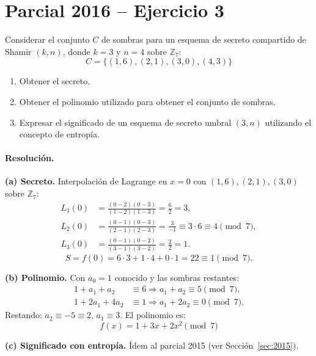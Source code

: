 \documentclass[11pt,a4paper]{article}
\begin{document}
\section{Parcial 2016 -- Ejercicio 3}
\label{sec:2016}

\begin{consignabox}
Considerar el conjunto $C$ de sombras para un esquema de secreto compartido de Shamir $(k,n)$, donde $k=3$ y $n=4$ sobre $\mathbb{Z}_7$:
\[
  C = \{(1,6),(2,1),(3,0),(4,3)\}
\]
\begin{enumerate}[label=\textbf{\alph*)}]
  \item Obtener el secreto.
  \item Obtener el polinomio utilizado para obtener el conjunto de sombras.
  \item Expresar el significado de un esquema de secreto umbral $(3,n)$ utilizando el concepto de entropía.
\end{enumerate}
\end{consignabox}

\paragraph{Resolución.}

\textbf{(a) Secreto.} Interpolación de Lagrange en $x=0$ con $(1,6),(2,1),(3,0)$ sobre $\mathbb{Z}_7$:
\begin{align*}
  L_1(0) &= \frac{(0-2)(0-3)}{(1-2)(1-3)} = \frac{6}{2} = 3, \\
  L_2(0) &= \frac{(0-1)(0-3)}{(2-1)(2-3)} = \frac{3}{-1} \equiv 3\cdot 6 \equiv 4 \pmod 7, \\
  L_3(0) &= \frac{(0-1)(0-2)}{(3-1)(3-2)} = \frac{2}{2} = 1.
\end{align*}
\[
  S = f(0) = 6\cdot 3 + 1\cdot 4 + 0\cdot 1 = 22 \equiv \boxed{1} \pmod 7.
\]

\textbf{(b) Polinomio.} Con $a_0=1$ conocido y las sombras restantes:
\begin{align*}
  1 + a_1 + a_2 &\equiv 6 \Rightarrow a_1 + a_2 \equiv 5 \pmod 7,\\
  1 + 2a_1 + 4a_2 &\equiv 1 \Rightarrow a_1 + 2a_2 \equiv 0 \pmod 7.
\end{align*}
Restando: $a_2 \equiv -5 \equiv 2$, $a_1 \equiv 3$. El polinomio es:
\[
  \boxed{f(x) = 1 + 3x + 2x^2 \pmod 7}
\]

\textbf{(c) Significado con entropía.} Ídem al parcial 2015 (ver Sección~\ref{sec:2015}).
\end{document}
